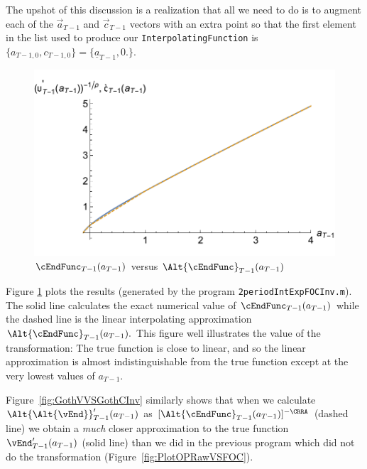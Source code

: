 \documentclass[titlepage]{\econtex}
\begin{document}
The upshot of this discussion is a realization that all we need to do is to
augment each of the $\vec{a}_{T-1}$ and $\vec{c}_{T-1}$ vectors with an extra point so that the
first element in the list used to produce our \texttt{InterpolatingFunction} is
$\{{a}_{T-1,0},{c}_{T-1,0}\}=\{\underline{a}_{T-1},0.\}$.

\hypertarget{GothVInvVSGothC}{}
\begin{figure}
        \includegraphics{./Figures/GothVInvVSGothC}
        \caption{$\cEndFunc_{T-1}({a}_{T-1})$ versus $\Alt{\cEndFunc}_{T-1}({a}_{T-1})$}
        \label{fig:GothVInvVSGothC}
\end{figure}



Figure
\ref{fig:GothVInvVSGothC} plots the results (generated by the program
\texttt{2periodIntExpFOCInv.m}).
  The solid line calculates the exact
numerical value of $\cEndFunc_{T-1}({a}_{T-1})$ while the dashed
line is the linear interpolating approximation
$\Alt{\cEndFunc}_{T-1}({a}_{T-1}).$ This figure well illustrates the
value of the transformation: The
 true function is close to linear,
and so the linear approximation is almost indistinguishable from the
true function except at the very lowest values of ${a}_{T-1}$.

Figure~\ref{fig:GothVVSGothCInv} similarly shows that when we calculate
$\Alt{\Alt{\vEnd}}_{T-1}^{\prime}({a}_{T-1})$ as
$[\Alt{\cEndFunc}_{T-1}({a}_{T-1})]^{-\CRRA}$ (dashed line) we
obtain a \textit{much} closer approximation to the true function
$\vEnd_{T-1}^{\prime}({a}_{T-1})$ (solid line) than we did in
the previous  program which did not do the
transformation (Figure~\ref{fig:PlotOPRawVSFOC}).
\end{document}
